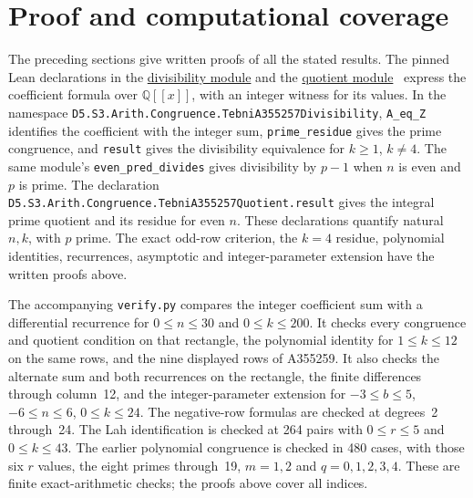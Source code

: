 \documentclass[11pt]{article}
\begin{document}
\section{Proof and computational coverage}
The preceding sections give written proofs of all the stated results.
The pinned Lean declarations in the
\href{https://github.com/the-omega-institute/trureturing/blob/3978330935ee256403f739686c6ae335ea620e68/D5/S3/Arith/Congruence/TebniA355257Divisibility.lean}{divisibility module}
and the
\href{https://github.com/the-omega-institute/trureturing/blob/3978330935ee256403f739686c6ae335ea620e68/D5/S3/Arith/Congruence/TebniA355257Quotient.lean}{quotient module}~\cite{leanmain,leanquotient} express
the coefficient formula over $\mathbb{Q}[[x]]$, with an integer witness
for its values. In the namespace
\nolinkurl{D5.S3.Arith.Congruence.TebniA355257Divisibility},
\texttt{A\_eq\_Z} identifies the coefficient with the integer sum,
\texttt{prime\_residue} gives the prime congruence,
and \texttt{result} gives the divisibility equivalence for $k\geq1$, $k\ne4$.
The same module's \texttt{even\_pred\_divides} gives divisibility by
$p-1$ when $n$ is even and $p$ is prime.
The declaration
\nolinkurl{D5.S3.Arith.Congruence.TebniA355257Quotient.result}
gives the integral prime quotient and its residue for even $n$.
These declarations quantify natural $n,k$, with $p$ prime.
The exact odd-row criterion, the $k=4$ residue, polynomial identities,
recurrences, asymptotic and integer-parameter extension have the
written proofs above.

The accompanying \texttt{verify.py} compares the integer coefficient
sum with a differential recurrence for $0\leq n\leq30$ and
$0\leq k\leq200$. It checks every congruence and quotient condition
on that rectangle, the polynomial identity for $1\leq k\leq12$
on the same rows, and the nine displayed rows of A355259.
It also checks the alternate sum and both recurrences on the rectangle,
the finite differences through column~12, and the integer-parameter
extension for $-3\leq b\leq5$, $-6\leq n\leq6$, $0\leq k\leq24$.
The negative-row formulas are checked at degrees~2 through~24.
The Lah identification is checked at 264 pairs with $0\leq r\leq5$
and $0\leq k\leq43$. The earlier polynomial congruence is checked
in 480 cases, with those six $r$ values, the eight primes through~19,
$m=1,2$ and $q=0,1,2,3,4$.
These are finite exact-arithmetic checks; the proofs above cover all indices.
\end{document}
